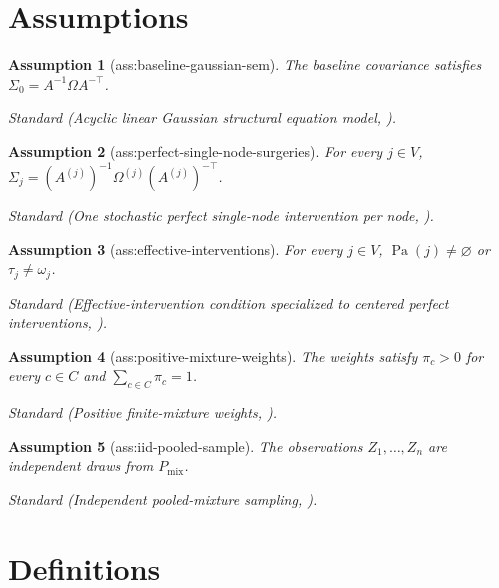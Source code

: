 \documentclass{article}
\newtheorem{assumption}{Assumption}
\begin{document}
\section{Assumptions}

\begin{assumption}[ass:baseline-gaussian-sem]\label{ass:baseline-gaussian-sem}
The baseline covariance satisfies \(\Sigma_0=A^{-1}\Omega A^{-\top}\).
\par\smallskip\noindent\emph{Standard} (Acyclic linear Gaussian structural equation model, \cite{pmlr-v202-squires23a}).
\end{assumption}

\begin{assumption}[ass:perfect-single-node-surgeries]\label{ass:perfect-single-node-surgeries}
For every \(j\in V\), \(\Sigma_j=(A^{(j)})^{-1}\Omega^{(j)}(A^{(j)})^{-\top}\).
\par\smallskip\noindent\emph{Standard} (One stochastic perfect single-node intervention per node, \cite{pmlr-v202-squires23a}).
\end{assumption}

\begin{assumption}[ass:effective-interventions]\label{ass:effective-interventions}
For every \(j\in V\), \(\operatorname{Pa}(j)\neq\varnothing\) or \(\tau_j\neq\omega_j\).
\par\smallskip\noindent\emph{Standard} (Effective-intervention condition specialized to centered perfect interventions, \cite{kumarShiragurUhler2024mixtures}).
\end{assumption}

\begin{assumption}[ass:positive-mixture-weights]\label{ass:positive-mixture-weights}
The weights satisfy \(\pi_c>0\) for every \(c\in C\) and \(\sum_{c\in C}\pi_c=1\).
\par\smallskip\noindent\emph{Standard} (Positive finite-mixture weights, \cite{kumarShiragurUhler2024mixtures}).
\end{assumption}

\begin{assumption}[ass:iid-pooled-sample]\label{ass:iid-pooled-sample}
The observations \(Z_1,\ldots,Z_n\) are independent draws from \(P_{\mathrm{mix}}\).
\par\smallskip\noindent\emph{Standard} (Independent pooled-mixture sampling, \cite{kumarShiragurUhler2024mixtures}).
\end{assumption}

\section{Definitions}
\end{document}

